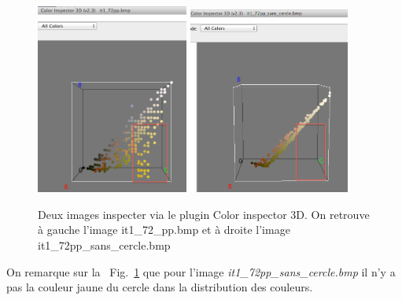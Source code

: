 \documentclass[a4paper,10pt]{article}
\begin{document}
\begin{figure}[ht]
\begin{center}
	\includegraphics[width=5cm]{images/it1_72pp}
	\includegraphics[width=5.3cm]{images/it1_72pp_sans_cercle}
\end{center}
	\caption{Deux images inspecter via le plugin Color inspector 3D. On retrouve \`a gauche l'image it1\_72\_pp.bmp et \`a droite l'image it1\_72pp\_sans\_cercle.bmp}
	\label{img5}
\end{figure}

On remarque sur la ~Fig.~\ref{img5} que pour l'image \emph{it1\_72pp\_sans\_cercle.bmp} il n'y a pas la couleur jaune du cercle dans la distribution des couleurs.
\end{document}
